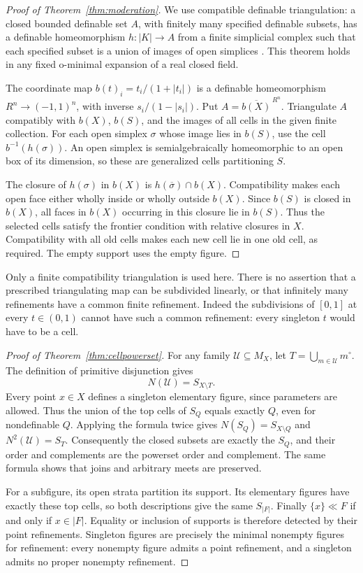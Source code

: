 \documentclass[11pt,a4paper]{article}
\theoremstyle{definition}
\begin{document}
\begin{proof}[Proof of Theorem~\ref{thm:moderation}]
We use compatible definable triangulation: a closed bounded definable set $A$, with finitely many specified definable subsets, has a definable homeomorphism $h:|K|\to A$ from a finite simplicial complex such that each specified subset is a union of images of open simplices \cite[Theorem~4.4, p.~42, proof pp.~42--44]{Coste}. This theorem holds in any fixed o-minimal expansion of a real closed field.

The coordinate map $b(t)_i=t_i/(1+|t_i|)$ is a definable homeomorphism $R^n\to(-1,1)^n$, with inverse $s_i/(1-|s_i|)$. Put $A=\overline{b(X)}^{\,R^n}$. Triangulate $A$ compatibly with $b(X)$, $b(S)$, and the images of all cells in the given finite collection. For each open simplex $\sigma$ whose image lies in $b(S)$, use the cell $b^{-1}(h(\sigma))$. An open simplex is semialgebraically homeomorphic to an open box of its dimension, so these are generalized cells partitioning $S$.

The closure of $h(\sigma)$ in $b(X)$ is $h(\overline\sigma)\cap b(X)$. Compatibility makes each open face either wholly inside or wholly outside $b(X)$. Since $b(S)$ is closed in $b(X)$, all faces in $b(X)$ occurring in this closure lie in $b(S)$. Thus the selected cells satisfy the frontier condition with relative closures in $X$. Compatibility with all old cells makes each new cell lie in one old cell, as required. The empty support uses the empty figure.
\end{proof}
Only a finite compatibility triangulation is used here. There is no assertion that a prescribed triangulating map can be subdivided linearly, or that infinitely many refinements have a common finite refinement. Indeed the subdivisions of $[0,1]$ at every $t\in(0,1)$ cannot have such a common refinement: every singleton $t$ would have to be a cell.

\begin{proof}[Proof of Theorem~\ref{thm:cellpowerset}]
For any family $\mathcal U\subseteq M_X$, let $T=\bigcup_{m\in\mathcal U}m^\circ$. The definition of primitive disjunction gives
\[
 N(\mathcal U)=S_{X\setminus T}.
\]
Every point $x\in X$ defines a singleton elementary figure, since parameters are allowed. Thus the union of the top cells of $S_Q$ equals exactly $Q$, even for nondefinable $Q$. Applying the formula twice gives $N(S_Q)=S_{X\setminus Q}$ and $N^2(\mathcal U)=S_T$. Consequently the closed subsets are exactly the $S_Q$, and their order and complements are the powerset order and complement. The same formula shows that joins and arbitrary meets are preserved.

For a subfigure, its open strata partition its support. Its elementary figures have exactly these top cells, so both descriptions give the same $S_{|F|}$. Finally $\{x\}\ll F$ if and only if $x\in|F|$. Equality or inclusion of supports is therefore detected by their point refinements. Singleton figures are precisely the minimal nonempty figures for refinement: every nonempty figure admits a point refinement, and a singleton admits no proper nonempty refinement.
\end{proof}
\end{document}
